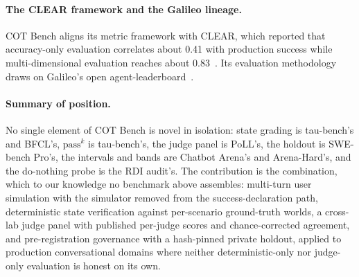 \paragraph{The CLEAR framework and the Galileo lineage.} COT Bench aligns its
metric framework with CLEAR, which reported that accuracy-only evaluation correlates
about 0.41 with production success while multi-dimensional evaluation reaches about
0.83~\cite{clear2025}. Its evaluation methodology draws on Galileo's open
agent-leaderboard~\cite{galileo2025}.

\paragraph{Summary of position.} No single element of COT Bench is novel in
isolation: state grading is tau-bench's and BFCL's, $\text{pass}^k$ is
tau-bench's, the judge panel is PoLL's, the holdout is SWE-bench Pro's, the
intervals and bands are Chatbot Arena's and Arena-Hard's, and the do-nothing probe
is the RDI audit's. The contribution is the combination, which to our knowledge no
benchmark above assembles: multi-turn user simulation with the simulator removed
from the success-declaration path, deterministic state verification against
per-scenario ground-truth worlds, a cross-lab judge panel with published per-judge
scores and chance-corrected agreement, and pre-registration governance with a
hash-pinned private holdout, applied to production conversational domains where
neither deterministic-only nor judge-only evaluation is honest on its own.
